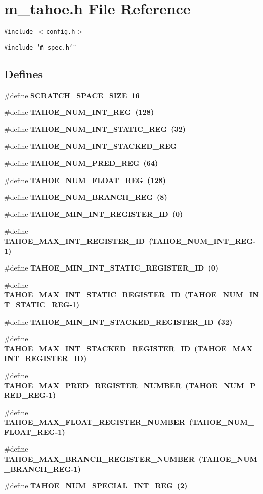 \section{m\_\-tahoe.h File Reference}
\label{m__tahoe_8h}
{\tt \#include $<$config.h$>$}\par
{\tt \#include \char`\"{}m\_\-spec.h\char`\"{}}\par
\subsection*{Defines}
\begin{CompactItemize}
\item 
\#define \bf{SCRATCH\_\-SPACE\_\-SIZE}~16
\item 
\#define \bf{TAHOE\_\-NUM\_\-INT\_\-REG}~(128)
\item 
\#define \bf{TAHOE\_\-NUM\_\-INT\_\-STATIC\_\-REG}~(32)
\item 
\#define \bf{TAHOE\_\-NUM\_\-INT\_\-STACKED\_\-REG}
\item 
\#define \bf{TAHOE\_\-NUM\_\-PRED\_\-REG}~(64)
\item 
\#define \bf{TAHOE\_\-NUM\_\-FLOAT\_\-REG}~(128)
\item 
\#define \bf{TAHOE\_\-NUM\_\-BRANCH\_\-REG}~(8)
\item 
\#define \bf{TAHOE\_\-MIN\_\-INT\_\-REGISTER\_\-ID}~(0)
\item 
\#define \bf{TAHOE\_\-MAX\_\-INT\_\-REGISTER\_\-ID}~(TAHOE\_\-NUM\_\-INT\_\-REG-1)
\item 
\#define \bf{TAHOE\_\-MIN\_\-INT\_\-STATIC\_\-REGISTER\_\-ID}~(0)
\item 
\#define \bf{TAHOE\_\-MAX\_\-INT\_\-STATIC\_\-REGISTER\_\-ID}~(TAHOE\_\-NUM\_\-INT\_\-STATIC\_\-REG-1)
\item 
\#define \bf{TAHOE\_\-MIN\_\-INT\_\-STACKED\_\-REGISTER\_\-ID}~(32)
\item 
\#define \bf{TAHOE\_\-MAX\_\-INT\_\-STACKED\_\-REGISTER\_\-ID}~(TAHOE\_\-MAX\_\-INT\_\-REGISTER\_\-ID)
\item 
\#define \bf{TAHOE\_\-MAX\_\-PRED\_\-REGISTER\_\-NUMBER}~(TAHOE\_\-NUM\_\-PRED\_\-REG-1)
\item 
\#define \bf{TAHOE\_\-MAX\_\-FLOAT\_\-REGISTER\_\-NUMBER}~(TAHOE\_\-NUM\_\-FLOAT\_\-REG-1)
\item 
\#define \bf{TAHOE\_\-MAX\_\-BRANCH\_\-REGISTER\_\-NUMBER}~(TAHOE\_\-NUM\_\-BRANCH\_\-REG-1)
\item 
\#define \bf{TAHOE\_\-NUM\_\-SPECIAL\_\-INT\_\-REG}~(2)

\end{CompactItemize}

